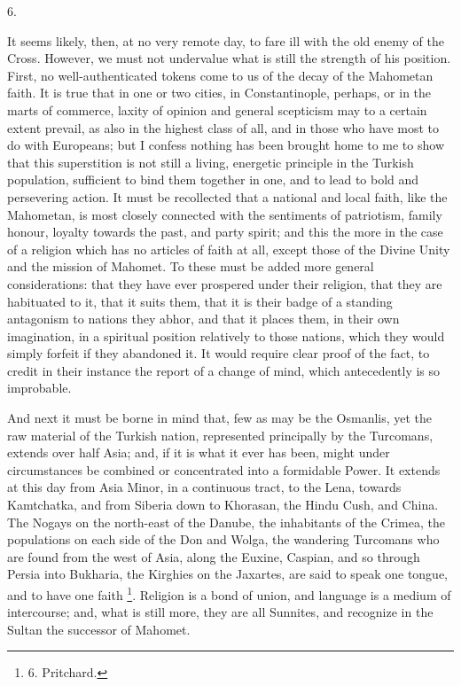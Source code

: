 6.

It seems likely, then, at no
very remote day, to fare ill with the old enemy of the Cross. However,
we must not undervalue what is still the strength of his position.
First, no well-authenticated tokens come to us of the decay of the
Mahometan faith. It is true that in one or two cities, in
Constantinople, perhaps, or in the marts of commerce, laxity of
opinion and general scepticism may to a certain extent prevail, as
also in the highest class of all, and in those who have most to do
with Europeans; but I confess nothing has been brought home to me to
show that this superstition is not still a living, energetic principle
in the Turkish population, sufficient to bind them together in one,
and to lead to bold and persevering action. It must be recollected
that a national and local faith, like the Mahometan, is most closely
connected with the sentiments of patriotism, family honour, loyalty
towards the past, and party spirit; and this the more in the case of a
religion which has no articles of faith at all, except those of the
Divine Unity and the mission of Mahomet. To these must be added more
general considerations: that they have ever prospered under their
religion, that they are habituated to it, that it suits them, that it
is their badge of a standing antagonism to nations they abhor, and
that it places them, in their own imagination, in a spiritual position
relatively to those nations, which they would simply forfeit if they
abandoned it. It would require clear proof of the fact, to credit in
their instance the report of a change of mind, which antecedently is
so improbable.

And next it must be borne in
mind that, few as may be the Osmanlis, yet the raw material of the
Turkish nation, represented principally by the Turcomans,
extends over half Asia; and, if it is what it ever has been, might
under circumstances be combined or concentrated into a formidable
Power. It extends at this day from Asia Minor, in a continuous tract,
to the Lena, towards Kamtchatka, and from Siberia down to Khorasan,
the Hindu Cush, and China. The Nogays on the north-east of the Danube,
the inhabitants of the Crimea, the populations on each side of the Don
and Wolga, the wandering Turcomans who are found from the west of
Asia, along the Euxine, Caspian, and so through Persia into Bukharia,
the Kirghies on the Jaxartes, are said to speak one tongue, and to
have one faith \footnote{6.
Pritchard.}. Religion
is a bond of union, and language is a medium of intercourse; and, what
is still more, they are all Sunnites, and recognize in the Sultan the
successor of Mahomet.

